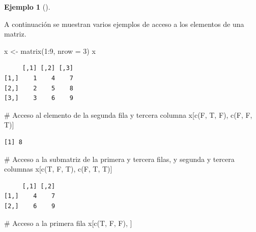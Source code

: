\documentclass[
  a4paper,
]{scrreport}
\newenvironment{Shaded}{\begin{snugshade}}{\end{snugshade}}
\newcommand{\AttributeTok}[1]{\textcolor[rgb]{0.40,0.45,0.13}{#1}}
\newcommand{\CommentTok}[1]{\textcolor[rgb]{0.37,0.37,0.37}{#1}}
\newcommand{\DecValTok}[1]{\textcolor[rgb]{0.68,0.00,0.00}{#1}}
\newcommand{\FunctionTok}[1]{\textcolor[rgb]{0.28,0.35,0.67}{#1}}
\newcommand{\NormalTok}[1]{\textcolor[rgb]{0.00,0.23,0.31}{#1}}
\newcommand{\OtherTok}[1]{\textcolor[rgb]{0.00,0.23,0.31}{#1}}
\newcommand{\SpecialCharTok}[1]{\textcolor[rgb]{0.37,0.37,0.37}{#1}}
\theoremstyle{definition}
\theoremstyle{definition}
\newtheorem{example}{Ejemplo}[chapter]
\theoremstyle{remark}
\begin{document}
\leavevmode{}%
\begin{example}[]\label{exm-acceso-matriz-logico}

A continuación se muestran varios ejemplos de acceso a los elementos de
una matriz.

\begin{Shaded}
\begin{Highlighting}[]
\NormalTok{x }\OtherTok{\textless{}{-}} \FunctionTok{matrix}\NormalTok{(}\DecValTok{1}\SpecialCharTok{:}\DecValTok{9}\NormalTok{, }\AttributeTok{nrow =} \DecValTok{3}\NormalTok{)}
\NormalTok{x}
\end{Highlighting}
\end{Shaded}

\begin{verbatim}
     [,1] [,2] [,3]
[1,]    1    4    7
[2,]    2    5    8
[3,]    3    6    9
\end{verbatim}

\begin{Shaded}
\begin{Highlighting}[]
\CommentTok{\# Acceso al elemento de la segunda fila y tercera columna}
\NormalTok{x[}\FunctionTok{c}\NormalTok{(F, T, F), }\FunctionTok{c}\NormalTok{(F, F, T)]}
\end{Highlighting}
\end{Shaded}

\begin{verbatim}
[1] 8
\end{verbatim}

\begin{Shaded}
\begin{Highlighting}[]
\CommentTok{\# Acceso a la submatriz de la primera y tercera filas, y segunda y tercera columnas}
\NormalTok{x[}\FunctionTok{c}\NormalTok{(T, F, T), }\FunctionTok{c}\NormalTok{(F, T, T)]}
\end{Highlighting}
\end{Shaded}

\begin{verbatim}
     [,1] [,2]
[1,]    4    7
[2,]    6    9
\end{verbatim}

\begin{Shaded}
\begin{Highlighting}[]
\CommentTok{\# Acceso a la primera fila}
\NormalTok{x[}\FunctionTok{c}\NormalTok{(T, F, F), ]}
\end{Highlighting}
\end{Shaded}


\end{example}
\end{document}
